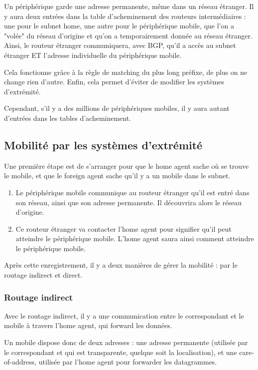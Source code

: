 	Un périphérique garde une adresse permanente, même dans un réseau étranger. Il y aura deux entrées dans la table d'acheminement des routeurs intermédiaires : une pour le subnet home, une autre pour le périphérique mobile, que l'on a "volée" du réseau d'origine et qu'on a temporairement donnée au réseau étranger. Ainsi, le routeur étranger communiquera, avec BGP, qu'il a accès au subnet étranger ET l'adresse individuelle du périphérique mobile.
  
	Cela fonctionne grâce à la règle de matching du plus long préfixe, de plus on ne change rien d'autre. Enfin, cela permet d'éviter de modifier les systèmes d'extrémité.
	
	Cependant, s'il y a des millions de périphériques mobiles, il y aura autant d'entrées dans les tables d'acheminement.
	
	\subsection{Mobilité par les systèmes d'extrémité}
	
	Une première étape est de s'arranger pour que le home agent sache où se trouve le mobile, et que le foreign agent sache qu'il y a un mobile dans le subnet.
	
	
	\begin{enumerate}
		\item Le périphérique mobile communique au routeur étranger qu'il est entré dans son réseau, ainsi que son adresse permanente. Il découvrira alors le réseau d'origine.
		\item Ce routeur étranger va contacter l'home agent pour signifier qu'il peut atteindre le périphérique mobile. L'home agent saura ainsi comment atteindre le périphérique mobile.
	\end{enumerate}
  
	Après cette enregistrement, il y a deux manières de gérer la mobilité : par le routage indirect et direct.
  
  		\subsubsection{Routage indirect}
		Avec le routage indirect, il y a une communication entre le correspondant et le mobile à travers l'home agent, qui forward les données.
	
		
		Un mobile dispose donc de deux adresses : une adresse permanente (utilisée par le correspondant et qui est transparente, quelque soit la localisation), et une care-of-address, utilisée par l'home agent pour forwarder les datagrammes.
  
